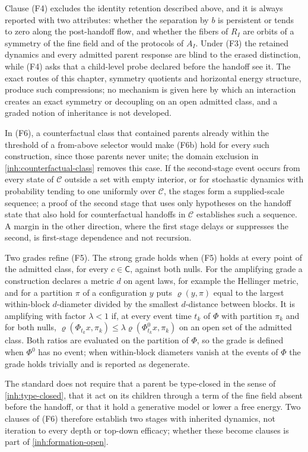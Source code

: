 Clause (F4) excludes the identity retention described above, and it is
always reported with two attributes: whether the separation by $b$ is
persistent or tends to zero along the post-handoff flow, and whether the
fibers of $R_I$ are orbits of a symmetry of the fine field and of the
protocols of $A_I$. Under (F3) the retained dynamics and every admitted
parent response are blind to the erased distinction, while (F4) asks that a
child-level probe declared before the handoff see it. The exact routes of
this chapter, symmetry quotients and horizontal energy structure, produce
such compressions; no mechanism is given here by which an interaction
creates an exact symmetry or decoupling on an open admitted class, and a
graded notion of inheritance is not developed.

In (F6), a counterfactual class that contained parents already within the
threshold of a from-above selector would make (F6b) hold for every such
construction, since those parents never unite; the domain exclusion in
\cref{inh:counterfactual-class} removes this case. If the second-stage event
occurs from every state of $\mathcal C$ outside a set with empty interior, or
for stochastic dynamics with probability tending to one uniformly over
$\mathcal C$, the stages form a supplied-scale sequence; a proof of the
second stage that uses only hypotheses on the handoff state that also hold
for counterfactual handoffs in $\mathcal C$ establishes such a sequence. A
margin in the other direction, where the first stage delays or suppresses
the second, is first-stage dependence and not recursion.

Two grades refine (F5). The strong grade holds when (F5) holds at every
point of the admitted class, for every $c\in\mathsf C$, against both nulls.
For the amplifying grade a construction declares a metric $d$ on agent laws,
for example the Hellinger metric, and for a partition $\pi$ of a
configuration $y$ puts $\varrho(y,\pi)$ equal to the largest within-block
$d$-diameter divided by the smallest $d$-distance between blocks. It is
amplifying with factor $\lambda<1$ if, at every event time $t_k$ of $\Phi$
with partition $\pi_k$ and for both nulls,
$\varrho(\Phi_{t_k}x,\pi_k)\leq\lambda\varrho(\Phi^0_{t_k}x,\pi_k)$ on an
open set of the admitted class. Both ratios are evaluated on the partition of
$\Phi$, so the grade is defined when $\Phi^0$ has no event; when within-block
diameters vanish at the events of $\Phi$ the grade holds trivially and is
reported as degenerate.

The standard does not require that a parent be type-closed in the sense of
\cref{inh:type-closed}, that it act on its children through a term of the
fine field absent before the handoff, or that it hold a generative model or
lower a free energy. Two clauses of (F6) therefore establish two stages with
inherited dynamics, not iteration to every depth or top-down efficacy;
whether these become clauses is part of \cref{inh:formation-open}.

